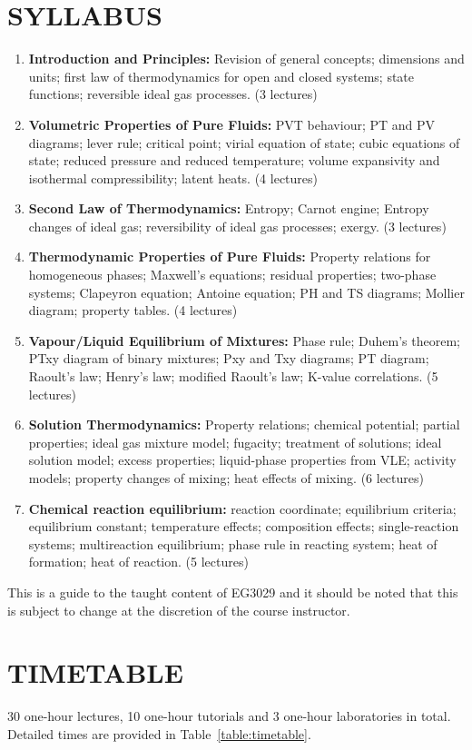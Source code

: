\documentclass[12pts,a4paper,amsmath,amssymb,floatfix]{article}%
\begin{document}
\section{SYLLABUS}
\begin{enumerate}[{\bf 1.}]
\item {\bf Introduction and Principles:} Revision of general concepts; dimensions and units; first law of thermodynamics for open and closed systems; state functions; reversible ideal gas processes.  (3 lectures)
\item {\bf Volumetric Properties of Pure Fluids:} PVT behaviour; PT and PV diagrams; lever rule; critical point; virial equation of state; cubic equations of state; reduced pressure and reduced temperature; volume expansivity and isothermal compressibility; latent heats.  (4 lectures)
\item {\bf Second Law of Thermodynamics:} Entropy; Carnot engine; Entropy changes of ideal gas; reversibility of ideal gas processes; exergy.  (3 lectures)
\item {\bf Thermodynamic Properties of Pure Fluids:} Property relations for homogeneous phases; Maxwell's equations; residual properties; two-phase systems; Clapeyron equation; Antoine equation; PH and TS diagrams; Mollier diagram; property tables.  (4 lectures)
\item {\bf Vapour/Liquid Equilibrium of Mixtures:} Phase rule; Duhem’s theorem; PTxy diagram of binary mixtures; Pxy and Txy diagrams; PT diagram; Raoult's law; Henry's law; modified Raoult's law; K-value correlations.  (5 lectures)
\item {\bf Solution Thermodynamics:} Property relations; chemical potential; partial properties; ideal gas mixture model; fugacity; treatment of solutions; ideal solution model; excess properties; liquid-phase properties from VLE; activity models; property changes of mixing; heat effects of mixing.  (6 lectures)
\item {\bf Chemical reaction equilibrium:} reaction coordinate; equilibrium criteria; equilibrium constant; temperature effects; composition effects; single-reaction systems; multireaction equilibrium; phase rule in reacting system; heat of formation; heat of reaction.  (5 lectures)
\end{enumerate}

\medskip
This is a guide to the taught content of EG3029 and it should be noted that this is subject to change at the discretion of the course instructor.


\section{TIMETABLE}
30 one-hour lectures, 10 one-hour tutorials and 3 one-hour laboratories in total. Detailed times are provided in Table~\ref{table:timetable}.
\end{document}
